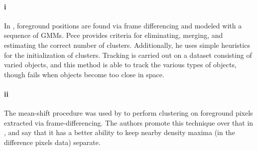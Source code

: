 \documentclass{article}
\begin{document}
\paragraph*{i}
In \citep{pece_2002}, foreground positions are found via frame differencing and modeled with a sequence of GMMs. Pece provides criteria for eliminating, merging, and estimating the correct number of clusters. Additionally, he uses simple heuristics for the initialization of clusters. Tracking is carried out on a dataset consisting of varied objects, and this method is able to track the various types of objects, though fails when objects become too close in space.

\paragraph*{ii}
The mean-shift procedure was used by \cite{beleznai_2006} to perform clustering on foreground pixels extracted via frame-differencing. The authors promote this technique over that in \citep{pece_2002}, and say that it has a better ability to keep nearby density maxima (in the difference pixels data) separate.











\begin{small}

 
\end{small}
\end{document}
